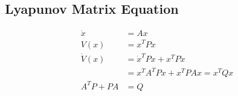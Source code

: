 \subsection{Lyapunov Matrix Equation}
\begin{align*}
    \Dot{x}    & = Ax                                \\
    V(x)       & = x^T P x                           \\
    \Dot{V}(x) & = \Dot{x}^T P x + x^T P \Dot{x}     \\
               & = x^T A^T P x + x^T P A x = x^T Q x \\
    A^T P + PA & = Q
\end{align*}

